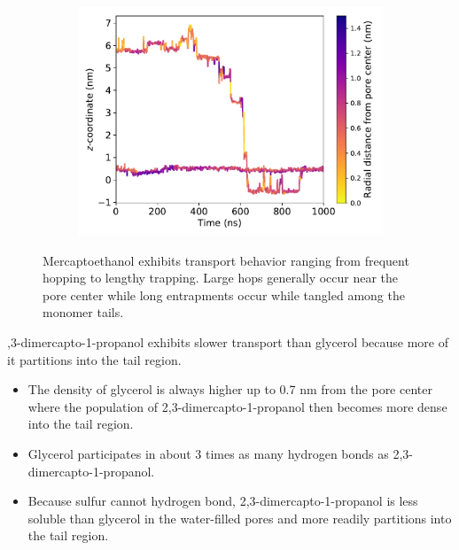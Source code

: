 \documentclass{article}
\begin{document}
  \begin{figure}
  \centering
  \begin{subfigure}{0.45\textwidth}
  \includegraphics[width=\linewidth]{SOH_trace.pdf}
  \caption{}\label{fig:SOH_trace}
  \end{subfigure}
  \caption{Mercaptoethanol exhibits transport behavior ranging from frequent hopping
  to lengthy trapping. Large hops generally occur near the pore center while 
  long entrapments occur while tangled among the monomer tails.}
  \end{figure}
  
  
  ,3-dimercapto-1-propanol exhibits slower transport than glycerol 
  because more of it partitions into the tail region. %
  \begin{itemize}
    \item The density of glycerol is always higher up to 0.7 nm from the 
    pore center where the population of 2,3-dimercapto-1-propanol then 
    becomes more dense into the tail region. 
    \item Glycerol participates in about 3 times as many hydrogen bonds
    as 2,3-dimercapto-1-propanol. %
    \item Because sulfur cannot hydrogen bond, 2,3-dimercapto-1-propanol is 
    less soluble than glycerol in the water-filled pores and more readily 
    partitions into the tail region.
  \end{itemize} 
  
\end{document}
